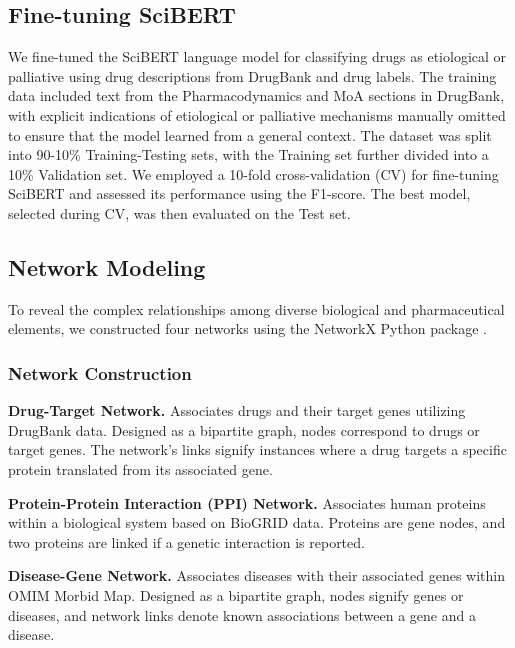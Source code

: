 \documentclass[journal,twoside,web]{ieeecolor}
\begin{document}
\subsection{Fine-tuning SciBERT}
\label{sec:SciBERT}
We fine-tuned the SciBERT language model \cite{beltagy2019scibert} for classifying drugs as etiological or palliative using drug descriptions from DrugBank and drug labels.
The training data included text from the Pharmacodynamics and MoA sections in DrugBank, with explicit indications of etiological or palliative mechanisms manually omitted to ensure that the model learned from a general context. 
The dataset was split into 90-10\% Training-Testing sets, with the Training set further divided into a 10\% Validation set. 
We employed a 10-fold cross-validation (CV) for fine-tuning SciBERT and assessed its performance using the F1-score.
The best model, selected during CV, was then evaluated on the Test set.

\subsection{Network Modeling}
\label{sec:networks}

To reveal the complex relationships among diverse biological and pharmaceutical elements, we constructed four networks using the NetworkX Python package \cite{SciPyProceedings_11}.

\subsubsection{Network Construction}
\label{sec:network_construction_1}
\textbf{Drug-Target Network.}
Associates drugs and their target genes utilizing DrugBank data.
Designed as a bipartite graph, nodes correspond to drugs or target genes.
The network's links signify instances where a drug targets a specific protein translated from its associated gene.

\noindent\textbf{Protein-Protein Interaction (PPI) Network.}
Associates human proteins within a biological system based on BioGRID data.
Proteins are gene nodes, and two proteins are linked if a genetic interaction is reported.

\noindent\textbf{Disease-Gene Network.}
Associates diseases with their associated genes within OMIM Morbid Map.
Designed as a bipartite graph, nodes signify genes or diseases, and network links denote known associations between a gene and a disease.
\end{document}
